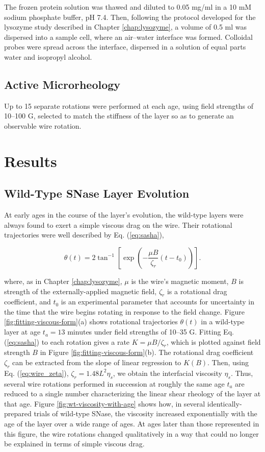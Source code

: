 The frozen protein solution was thawed and diluted to 0.05 mg/ml in a 10 mM sodium phosphate buffer, pH 7.4. Then, following the protocol developed for the lysozyme study described in Chapter \ref{chap:lysozyme}, a volume of 0.5 ml was dispersed into a sample cell, where an air--water interface was formed. Colloidal probes were spread across the interface, dispersed in a solution of equal parts water and isopropyl alcohol.

\subsection{Active Microrheology}

Up to 15 separate rotations were performed at each age, using field strengths of 10--100 G, selected to match the stiffness of the layer so as to generate an observable wire rotation.


\section{Results}
\subsection{Wild-Type SNase Layer Evolution}

At early ages in the course of the layer's evolution, the wild-type layers were always found to exert a simple viscous drag on the wire. Their rotational trajectories were well described by Eq. (\ref{eq:sasha}),

\begin{equation*}
 \theta(t) = 2 \tan^{-1} \left[ \exp \left( -\frac{\mu B}{\zeta_r} (t-t_0) \right) \right].
\end{equation*}

where, as in Chapter \ref{chap:lysozyme}, $\mu$ is the wire's magnetic moment, $B$ is strength of the externally-applied magnetic field, $\zeta_r$ is a rotational drag coefficient, and $t_0$ is an experimental parameter that accounts for uncertainty in the time that the wire begins rotating in response to the field change. Figure \ref{fig:fitting-viscous-form}(a) shows rotational trajectories $\theta(t)$ in a wild-type layer at age $t_a=13$ minutes under field strengths of 10--35 G. Fitting Eq. (\ref{eq:sasha}) to each rotation gives a rate $K=\mu B/\zeta_r$, which is plotted against field strength $B$ in Figure \ref{fig:fitting-viscous-form}(b). The rotational drag coefficient $\zeta_r$ can be extracted from the slope of linear regression to $K(B)$. Then, using Eq. (\ref{eq:wire_zeta}), $\zeta_r = 1.48 L^2\eta_s$, we obtain the interfacial viscosity $\eta_s$. Thus, several wire rotations performed in succession at roughly the same age $t_a$ are reduced to a single number characterizing the linear shear rheology of the layer at that age. Figure \ref{fig:wt-viscosity-with-age} shows how, in several identically-prepared trials of wild-type SNase, the viscosity increased exponentially with the age of the layer over a wide range of ages. At ages later than those represented in this figure, the wire rotations changed qualitatively in a way that could no longer be explained in terms of simple viscous drag.

